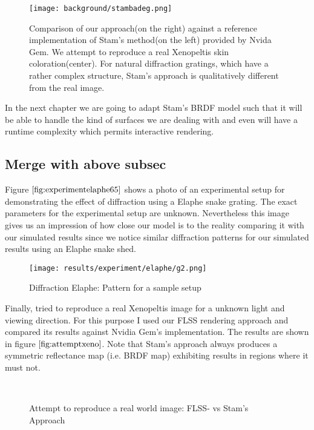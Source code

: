 \begin{figure}[H]
  \centering
  \texttt{[image: background/stambadeg.png]}
  \caption[Comparing Stam's approach: Bad Example]{Comparison of our approach(on the right) against a reference implementation of Stam's method(on the left) provided by Nvida Gem. We attempt to reproduce a real Xenopeltis skin coloration(center). For natural diffraction gratings, which have a rather complex structure, Stam's approach is qualitatively different from the real image.}
  \label{fig:stameggratingsbadeg}  
\end{figure}

In the next chapter we are going to adapt Stam's BRDF model such that it will be able to handle the kind of surfaces we are dealing with and even will have a runtime complexity which permits interactive rendering.

\subsection{Merge with above subsec}
Figure $\ref{fig:experimentelaphe65}$ shows a photo of an experimental setup for demonstrating the effect of diffraction using a Elaphe snake grating. The exact parameters for the experimental setup are unknown. Nevertheless this image gives us an impression of how close our model is to the reality comparing it with our simulated results since we notice similar diffraction patterns for our simulated results using an Elaphe snake shed. 

\begin{figure}[H]
  \texttt{[image: results/experiment/elaphe/g2.png]}
  \caption{Diffraction Elaphe: Pattern for a sample setup}
  \label{fig:experimentelaphe65}
\end{figure}

Finally, tried to reproduce a real Xenopeltis image for a unknown light and viewing direction. For this purpose I used our FLSS rendering approach and compared its results against Nvidia Gem's implementation. The results are shown in figure $\ref{fig:attemptxeno}$. Note that Stam's approach always produces a symmetric reflectance map (i.e. BRDF map) exhibiting results in regions where it must not. 

\begin{figure}[H]
  \centering

~  
  
\caption[Snake Renderings: Stam's- vs. Flss- Approach on Xenopeltis]{Attempt to reproduce a real world image: FLSS- vs Stam's Approach}
\label{fig:attemptxeno}
\end{figure}

